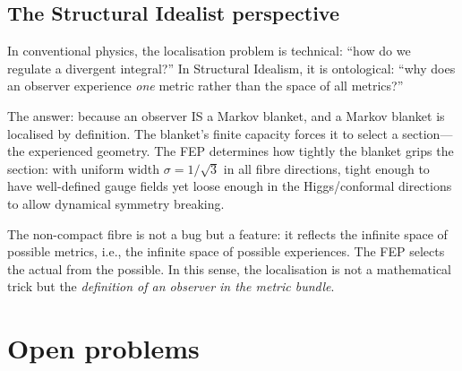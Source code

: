 \documentclass[12pt, a4paper]{article}
\theoremstyle{definition}
\theoremstyle{remark}
\begin{document}
\subsection{The Structural Idealist perspective}

In conventional physics, the localisation problem is technical: ``how do we regulate a divergent integral?''
In Structural Idealism, it is ontological: ``why does an observer experience \emph{one} metric rather than the space of all metrics?''

The answer: because an observer IS a Markov blanket, and a Markov blanket is localised by definition.
The blanket's finite capacity forces it to select a section---the experienced geometry.
The FEP determines how tightly the blanket grips the section: with uniform width $\sigma = 1/\sqrt{3}$ in all fibre directions, tight enough to have well-defined gauge fields yet loose enough in the Higgs/conformal directions to allow dynamical symmetry breaking.

The non-compact fibre is not a bug but a feature: it reflects the infinite space of possible metrics, i.e., the infinite space of possible experiences.
The FEP selects the actual from the possible.
In this sense, the localisation is not a mathematical trick but the \emph{definition of an observer in the metric bundle}.


\section{Open problems}
\label{sec:open}
\end{document}
